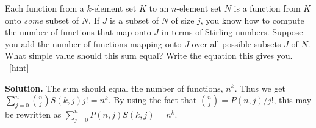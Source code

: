 \documentclass{book}
\begin{document}
\setcounter{project}{204}
\addtocounter{project}{-1}
\begin{activity}[]\label{Stirlingfalling}
\hypertarget{p-1168}{}%
Each function from a \(k\)-element set \(K\) to an \(n\)-element set \(N\) is a function from \(K\) onto \emph{some} subset of \(N\). If \(J\) is a subset of \(N\) of size \(j\), you know how to compute the number of functions that map onto \(J\) in terms of Stirling numbers. Suppose you add the number of functions mapping onto \(J\) over all possible subsets \(J\) of \(N\). What simple value should this sum equal? Write the equation this gives you.%
~\hfill{\tiny\hyperlink{a-204}{[hint]}\hypertarget{q-204}{}}\par\smallskip%
\noindent\textbf{Solution.}\hypertarget{solution-128}{}\quad%
\hypertarget{p-1170}{}%
The sum should equal the number of functions, \(n^k\). Thus we get \(\sum_{j=0}^n \binom{n}{j}S(k,j)j! = n^k\). By using the fact that \(\binom{n}{j}= P(n,j)/j!\), this may be rewritten as \(\sum_{j=0}^n P(n,j)S(k,j) = n^k.\)%
\end{activity}
\end{document}
